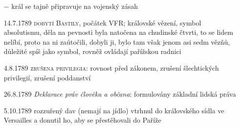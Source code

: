 \documentclass{article}
\begin{document}
\begin{itemize}
    \item[$-$] král se tajně připravuje na vojenský zásah
    \item[14.7.1789] \textsc{dobytí Bastily}, počátek VFR; královské vězení, symbol absolutismu, děla na pevnosti byla natočena na chudinské čtvrti, to se lidem nelíbí, proto na ni zaútočili, dobyli ji, bylo tam však jenom asi sedm vězňů, důležité spíš jako symbol, rovněž ovládají pařížskou radnici
    \item[4.8.1789] \textsc{zrušena privilegia}: rovnost před zákonem, zrušení šlechtických privilegií, zrušení poddanství
    \item[26.8.1789] \textit{Deklarace práv člověka a občana}: formulovány základní lidská práva
    \item[5.10.1789] rozzuřený dav (nemají na jídlo) vtrhnul do královského sídla ve Versailles a donutil ho, aby se přestěhovali do Paříže
\end{itemize}
\end{document}
